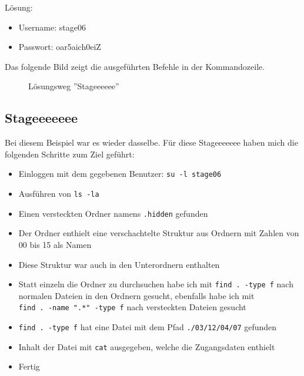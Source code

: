 \documentclass[12pt, a4paper, titlepage, oneside]{scrartcl}
\begin{document}
	Lösung:
	\begin{itemize}
		\item Username: stage06

		\item Passwort: oar5aich0eiZ
	\end{itemize}

	Das folgende Bild zeigt die ausgeführten Befehle in der Kommandozeile.

	\begin{figure}[h!]
		\centering
		\caption{Lösungsweg ''Stageeeeee''}
		\label{fig:stageeeeee_solution}
	\end{figure}

	\newpage

	\subsection{Stageeeeeee}
	Bei diesem Beispiel war es wieder dasselbe. Für diese Stageeeeeee haben mich
	die folgenden Schritte zum Ziel geführt:

	\begin{itemize}
		\item Einloggen mit dem gegebenen Benutzer: \lstinline{su -l stage06}

		\item Ausführen von \lstinline{ls -la}

		\item Einen versteckten Ordner namens \lstinline{.hidden} gefunden

		\item Der Ordner enthielt eine verschachtelte Struktur aus Ordnern mit Zahlen
			von 00 bis 15 als Namen

		\item Diese Struktur war auch in den Unterordnern enthalten

		\item Statt einzeln die Ordner zu durchsuchen habe ich mit \lstinline{find . -type f}
			nach normalen Dateien in den Ordnern gesucht, ebenfalls habe ich mit \\ \lstinline{find . -name ".*" -type f}
			nach versteckten Dateien gesucht

		\item \lstinline{find . -type f} hat eine Datei mit dem Pfad \lstinline{./03/12/04/07}
			gefunden

		\item Inhalt der Datei mit \lstinline{cat} ausgegeben, welche die Zugangsdaten
			enthielt

		\item Fertig
	\end{itemize}
\end{document}
